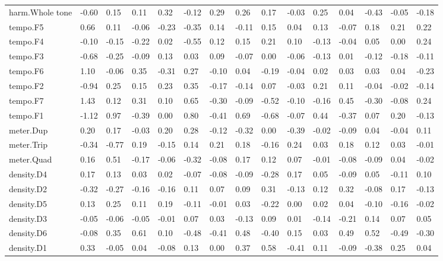 \documentclass[
]{article}
\newenvironment{lltable}{\begin{landscape}\begin{center}\begin{ThreePartTable}}{\end{ThreePartTable}\end{center}\end{landscape}}
\begin{document}
\begin{lltable}
{\begin{longtable}{lllllllllllllll}
harm.Whole tone & -0.60 & 0.15 & 0.11 & 0.32 & -0.12 & 0.29 & 0.26 & 0.17 & -0.03 & 0.25 & 0.04 & -0.43 & -0.05 & -0.18\\
tempo.F5 & 0.66 & 0.11 & -0.06 & -0.23 & -0.35 & 0.14 & -0.11 & 0.15 & 0.04 & 0.13 & -0.07 & 0.18 & 0.21 & 0.22\\
tempo.F4 & -0.10 & -0.15 & -0.22 & 0.02 & -0.55 & 0.12 & 0.15 & 0.21 & 0.10 & -0.13 & -0.04 & 0.05 & 0.00 & 0.24\\
tempo.F3 & -0.68 & -0.25 & -0.09 & 0.13 & 0.03 & 0.09 & -0.07 & 0.00 & -0.06 & -0.13 & 0.01 & -0.12 & -0.18 & -0.11\\
tempo.F6 & 1.10 & -0.06 & 0.35 & -0.31 & 0.27 & -0.10 & 0.04 & -0.19 & -0.04 & 0.02 & 0.03 & 0.03 & 0.04 & -0.23\\
tempo.F2 & -0.94 & 0.25 & 0.15 & 0.23 & 0.35 & -0.17 & -0.14 & 0.07 & -0.03 & 0.21 & 0.11 & -0.04 & -0.02 & -0.14\\
tempo.F7 & 1.43 & 0.12 & 0.31 & 0.10 & 0.65 & -0.30 & -0.09 & -0.52 & -0.10 & -0.16 & 0.45 & -0.30 & -0.08 & 0.24\\
tempo.F1 & -1.12 & 0.97 & -0.39 & 0.00 & 0.80 & -0.41 & 0.69 & -0.68 & -0.07 & 0.44 & -0.37 & 0.07 & 0.20 & -0.13\\
meter.Dup & 0.20 & 0.17 & -0.03 & 0.20 & 0.28 & -0.12 & -0.32 & 0.00 & -0.39 & -0.02 & -0.09 & 0.04 & -0.04 & 0.11\\
meter.Trip & -0.34 & -0.77 & 0.19 & -0.15 & 0.14 & 0.21 & 0.18 & -0.16 & 0.24 & 0.03 & 0.18 & 0.12 & 0.03 & -0.01\\
meter.Quad & 0.16 & 0.51 & -0.17 & -0.06 & -0.32 & -0.08 & 0.17 & 0.12 & 0.07 & -0.01 & -0.08 & -0.09 & 0.04 & -0.02\\
density.D4 & 0.17 & 0.13 & 0.03 & 0.02 & -0.07 & -0.08 & -0.09 & -0.28 & 0.17 & 0.05 & -0.09 & 0.05 & -0.11 & 0.10\\
density.D2 & -0.32 & -0.27 & -0.16 & -0.16 & 0.11 & 0.07 & 0.09 & 0.31 & -0.13 & 0.12 & 0.32 & -0.08 & 0.17 & -0.13\\
density.D5 & 0.13 & 0.25 & 0.11 & 0.19 & -0.11 & -0.01 & 0.03 & -0.22 & 0.00 & 0.02 & 0.04 & -0.10 & -0.16 & -0.02\\
density.D3 & -0.05 & -0.06 & -0.05 & -0.01 & 0.07 & 0.03 & -0.13 & 0.09 & 0.01 & -0.14 & -0.21 & 0.14 & 0.07 & 0.05\\
density.D6 & -0.08 & 0.35 & 0.61 & 0.10 & -0.48 & -0.41 & 0.48 & -0.40 & 0.15 & 0.03 & 0.49 & 0.52 & -0.49 & -0.30\\
density.D1 & 0.33 & -0.05 & 0.04 & -0.08 & 0.13 & 0.00 & 0.37 & 0.58 & -0.41 & 0.11 & -0.09 & -0.38 & 0.25 & 0.04\\

\end{longtable}}
\end{lltable}
\end{document}
